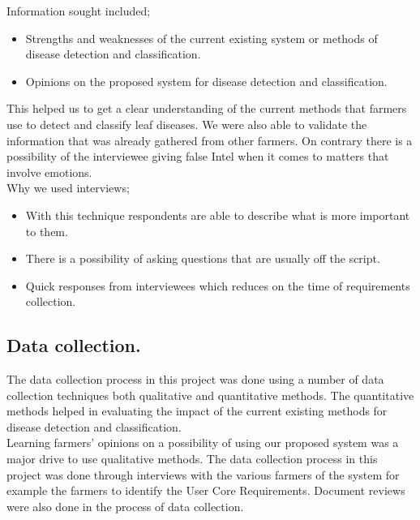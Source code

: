 \documentclass[11pt]{report}
\begin{document}
Information sought included;
\begin{itemize}
	\item Strengths and weaknesses of the current existing system or methods of disease detection and classification.
	
	\item Opinions on the proposed system for disease detection and classification.
\end{itemize}

This helped us to get a clear understanding of the current methods that farmers use to detect and classify leaf diseases. We were also able
to validate the information that was already gathered from other farmers.
On contrary there is a possibility of the interviewee giving false Intel when it comes to matters that
involve emotions.\\


Why we used interviews;

\begin{itemize}
	\item With this technique respondents are able to describe what is more important to them.\\
	\item There is a possibility of asking questions that are usually off the script.\\
	\item Quick responses from interviewees which reduces on the time of requirements collection.
\end{itemize}



\subsection{Data collection.}
The data collection process in this project was done using a number of data collection techniques
both qualitative and quantitative methods. The quantitative methods helped in evaluating the impact
of the current existing methods for disease detection and classification.\\

Learning farmers’ opinions
on a possibility of using our proposed system was a major drive to use qualitative
methods.
The data collection process in this project was done through interviews with the various
farmers of the system for example the farmers to identify the User Core Requirements.
Document reviews were also done in the process of data collection.\\
\end{document}
